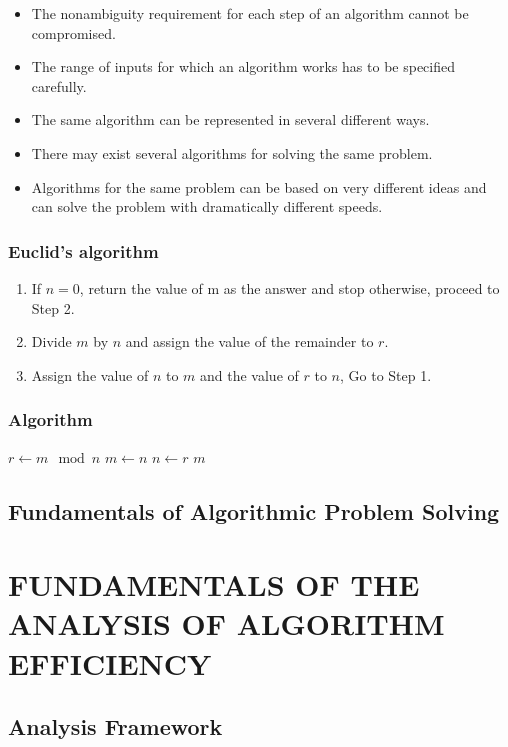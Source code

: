 \documentclass{article}
\begin{document}
	\begin{itemize}
		\item The nonambiguity requirement for each step of an algorithm cannot be compromised.
		\item The range of inputs for which an algorithm works has to be specified carefully.
		\item The same algorithm can be represented in several different ways.
		\item There may exist several algorithms for solving the same problem.
		\item Algorithms for the same problem can be based on very different ideas and can solve the problem
			with dramatically different speeds.
	\end{itemize}

	\subsubsection{Euclid's algorithm}
	\begin{enumerate}[label=\textbf{Step \arabic* :},itemindent=4em]
		\item If $n = 0$, return the value of m as the answer and stop otherwise, proceed to Step 2.
		\item Divide $m$ by $n$ and assign the value of the remainder to $r$.
		\item Assign the value of $n$ to $m$ and the value of $r$ to $n$, Go to Step 1.
	\end{enumerate}

	\subsubsection{Algorithm}
	\begin{algorithmic}
		\PROCEDURE {}
			\STATE $r\gets m\mod n$
			\STATE $m\gets n$
			\STATE $n\gets r$
		\ENDWHILE
		\RETURN $m$
	\end{algorithmic}

	\subsection{Fundamentals of Algorithmic Problem Solving}

	\section{FUNDAMENTALS OF THE ANALYSIS OF ALGORITHM EFFICIENCY}
	\subsection{Analysis Framework}
\end{document}
